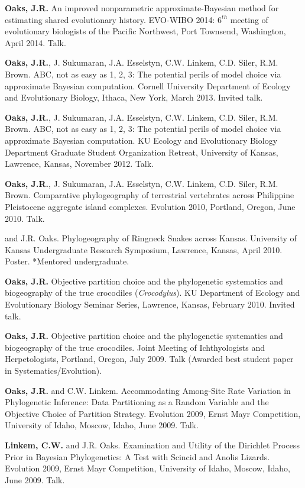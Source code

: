 \myHangIndent
{\bf Oaks, J.R.}
An improved nonparametric approximate-Bayesian method for estimating shared
evolutionary history.
EVO-WIBO 2014: $6^{th}$ meeting of evolutionary biologists of the Pacific
Northwest, Port Townsend, Washington, April 2014.
Talk.

\myHangIndent
{\bf Oaks, J.R.}, J. Sukumaran, J.A. Esselstyn, C.W. Linkem, C.D. Siler, R.M.
Brown.
ABC, not as easy as 1, 2, 3: The potential perils of model choice via
approximate Bayesian computation.
Cornell University Department of Ecology and Evolutionary Biology, Ithaca,
New York, March 2013.
Invited talk.

\myHangIndent
{\bf Oaks, J.R.}, J. Sukumaran, J.A. Esselstyn, C.W. Linkem, C.D. Siler, R.M.
Brown.
ABC, not as easy as 1, 2, 3: The potential perils of model choice via
approximate Bayesian computation.
KU Ecology and Evolutionary Biology Department Graduate Student Organization
Retreat, University of Kansas, Lawrence, Kansas, November 2012.
Talk.

\myHangIndent
{\bf Oaks, J.R.}, J. Sukumaran, J.A. Esselstyn, C.W. Linkem, C.D. Siler, R.M.
Brown.
Comparative phylogeography of terrestrial vertebrates across Philippine
Pleistocene aggregate island complexes.
Evolution 2010, Portland, Oregon, June 2010.
Talk.

\myHangIndent
{} and J.R. Oaks.
Phylogeography of Ringneck Snakes across Kansas.
University of Kansas Undergraduate Research Symposium, Lawrence, Kansas, April
2010.
Poster.
*Mentored undergraduate.

\myHangIndent
{\bf Oaks, J.R.}
Objective partition choice and the phylogenetic systematics and biogeography of
the true crocodiles (\emph{Crocodylus}).
KU Department of Ecology and Evolutionary Biology Seminar Series, Lawrence,
Kansas, February 2010.
Invited talk.

\myHangIndent
{\bf Oaks, J.R.}
Objective partition choice and the phylogenetic systematics and biogeography of
the true crocodiles.
Joint Meeting of Ichthyologists and Herpetologists, Portland, Oregon, July
2009.
Talk (Awarded best student paper in Systematics/Evolution).

\myHangIndent
{\bf Oaks, J.R.} and C.W. Linkem.
Accommodating Among-Site Rate Variation in Phylogenetic Inference: Data
Partitioning as a Random Variable and the Objective Choice of Partition
Strategy.
Evolution 2009, Ernst Mayr Competition, University of Idaho, Moscow, Idaho,
June 2009.
Talk.

\myHangIndent
{\bf Linkem, C.W.} and J.R. Oaks.
Examination and Utility of the Dirichlet Process Prior in Bayesian
Phylogenetics: A Test with Scincid and Anolis Lizards.
Evolution 2009, Ernst Mayr Competition, University of Idaho, Moscow, Idaho,
June 2009.
Talk.

